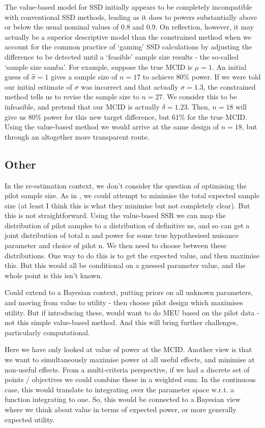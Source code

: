 \documentclass[sagev, Crown]{sagej}
\begin{document}
The value-based model for SSD initially appears to be completely incompatible with conventional SSD methods, leading as it does to powers substantially above or below the usual nominal values of 0.8 and 0.9. On reflection, however, it may actually be a superior descriptive model than the constrained method when we account for the common practice of `gaming' SSD calculations by adjusting the difference to be detected until a `feasible' sample size results - the so-called `sample size samba'. For example, suppose the true MCID is $\mu = 1$. An initial guess of $\hat{\sigma} = 1$ gives a sample size of $n = 17$ to achieve 80\% power. If we were told our initial estimate of $\sigma$ was incorrect and that actually $\sigma = 1.3$, the constrained method tells us to revise the sample size to $n = 27$. We consider this to be infeasible, and pretend that our MCID is actually $\delta = 1.23$. Then, $n = 18$ will give us 80\% power for this new target difference, but 61\% for the true MCID. Using the value-based method we would arrive at the same design of $n = 18$, but through an altogether more transparent route.

\subsection{Other}

In the re-estimation context, we don't consider the question of optimising the pilot sample size. As in \cite{Whitehead2015}, we could attempt to minimise the total expected sample size (at least I think this is what they minimise but not completely clear). But this is not straightforward. Using the value-based SSR we can map the distribution of pilot samples to a distribution of definitive ns, and so can get a joint distribution of total n and power for some true hypothesised nuisance parameter and choice of pilot n. We then need to choose between these distributions. One way to do this is to get the expected value, and then maximise this. But this would all be conditional on a guessed parameter value, and the whole point is this isn't known.

Could extend to a Bayesian context, putting priors on all unknown parameters, and moving from value to utility - then choose pilot design which maximises utility. But if introducing these, would want to do MEU based on the pilot data - not this simple value-based method. And this will bring further challenges, particularly computational.

Here we have only looked at value of power at the MCID. Another view is that we want to simultaneously maximise power at all useful effects, and minimise at non-useful effects. From a multi-criteria perspective, if we had a discrete set of points / objectives we could combine these in a weighted sum. In the continuous case, this would translate to integrating over the parameter space w.r.t. a function integrating to one. So, this would be connected to a Bayesian view where we think about value in terms of expected power, or more generally expected utility. 
\end{document}
